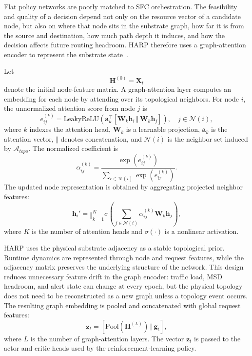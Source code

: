 \documentclass[final,5p]{elsarticle}
\begin{document}
Flat policy networks are poorly matched to SFC orchestration. The feasibility and quality of a decision depend not only on the resource vector of a candidate node, but also on where that node sits in the substrate graph, how far it is from the source and destination, how much path depth it induces, and how the decision affects future routing headroom. HARP therefore uses a graph-attention encoder to represent the substrate state~\cite{velickovic2018graph}.

Let
\begin{equation}
    \mathbf{H}^{(0)} = \mathbf{X}_t
\end{equation}
denote the initial node-feature matrix. A graph-attention layer computes an embedding for each node by attending over its topological neighbors. For node \(i\), the unnormalized attention score from node \(j\) is
\begin{equation}
    e_{ij}^{(k)} =
    \mathrm{LeakyReLU}
    \left(
        \mathbf{a}_k^{\top}
        \left[
            \mathbf{W}_k \mathbf{h}_i
            \,\Vert\,
            \mathbf{W}_k \mathbf{h}_j
        \right]
    \right),
    \quad j \in \mathcal{N}(i),
\end{equation}
where \(k\) indexes the attention head, \(\mathbf{W}_k\) is a learnable projection, \(\mathbf{a}_k\) is the attention vector, \(\Vert\) denotes concatenation, and \(\mathcal{N}(i)\) is the neighbor set induced by \(\mathcal{A}_{topo}\). The normalized coefficient is
\begin{equation}
    \alpha_{ij}^{(k)} =
    \frac{\exp(e_{ij}^{(k)})}
    {\sum_{r \in \mathcal{N}(i)} \exp(e_{ir}^{(k)})}.
\end{equation}
The updated node representation is obtained by aggregating projected neighbor features:
\begin{equation}
    \mathbf{h}_i' =
    \mathop{\Vert}_{k=1}^{K}
    \sigma
    \left(
        \sum_{j \in \mathcal{N}(i)}
        \alpha_{ij}^{(k)} \mathbf{W}_k \mathbf{h}_j
    \right),
\end{equation}
where \(K\) is the number of attention heads and \(\sigma(\cdot)\) is a nonlinear activation.

HARP uses the physical substrate adjacency as a stable topological prior. Runtime dynamics are represented through node and request features, while the adjacency matrix preserves the underlying structure of the network. This design reduces unnecessary feature drift in the graph encoder: traffic load, MSD headroom, and alert state can change at every epoch, but the physical topology does not need to be reconstructed as a new graph unless a topology event occurs. The resulting graph embedding is pooled and concatenated with global request features:
\begin{equation}
    \mathbf{z}_t =
    \left[
        \mathrm{Pool}\left(\mathbf{H}^{(L)}\right)
        \,\Vert\,
        \mathbf{g}_t
    \right],
\end{equation}
where \(L\) is the number of graph-attention layers. The vector \(\mathbf{z}_t\) is passed to the actor and critic heads used by the reinforcement-learning policy.
\end{document}
